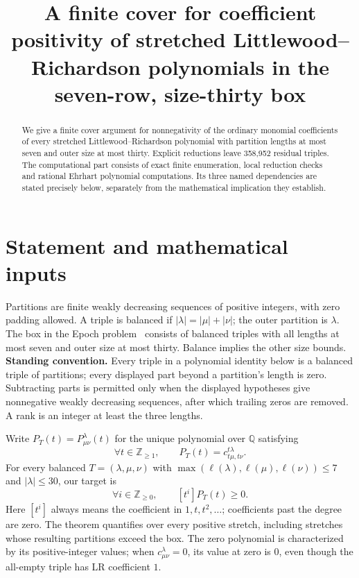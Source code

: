 \documentclass[11pt]{article}
\title{A finite cover for coefficient positivity of stretched
Littlewood--Richardson polynomials in the seven-row, size-thirty box}
\author{}
\date{}
\begin{document}
\maketitle
\begin{abstract}
We give a finite cover argument for nonnegativity of the ordinary monomial
coefficients of every stretched Littlewood--Richardson polynomial with
partition lengths at most seven and outer size at most thirty. Explicit
reductions leave 358,952 residual triples. The computational part consists
of exact finite enumeration, local reduction checks and rational Ehrhart
polynomial computations. Its three named dependencies are stated precisely
below, separately from the mathematical implication they establish.
\end{abstract}
\section{Statement and mathematical inputs}
Partitions are finite weakly decreasing sequences of positive integers,
with zero padding allowed. A triple is balanced if
$|\lambda|=|\mu|+|\nu|$; the outer partition is $\lambda$.
The box in the Epoch problem~\cite{Epoch} consists of balanced triples
with all lengths at most seven and outer size at most thirty. Balance implies the other size bounds.
\textbf{Standing convention.} Every triple in a polynomial identity below
is a balanced triple of partitions; every displayed part beyond a partition's
length is zero. Subtracting parts is permitted only when the displayed
hypotheses give nonnegative weakly decreasing sequences, after which trailing
zeros are removed. A rank is an integer at least the three lengths.

Write $P_T(t)=P^\lambda_{\mu\nu}(t)$ for the unique polynomial over
$\mathbb Q$ satisfying
\[
 \forall t\in\mathbb Z_{\ge1},\qquad P_T(t)=c^{t\lambda}_{t\mu,t\nu}.
\]
For every balanced $T=(\lambda,\mu,\nu)$ with
$\max(\ell(\lambda),\ell(\mu),\ell(\nu))\le7$ and $|\lambda|\le30$,
our target is
\[
 \forall i\in\mathbb Z_{\ge0},\qquad [t^i]P_T(t)\ge0.
\]
Here $[t^i]$ always means the coefficient in $1,t,t^2,\ldots$; coefficients
past the degree are zero. The theorem quantifies over every positive
stretch, including stretches whose resulting partitions exceed the box.
The zero polynomial is characterized by its positive-integer values;
when $c^\lambda_{\mu\nu}=0$, its value at zero is $0$, even though the
all-empty triple has LR coefficient $1$.
\end{document}
